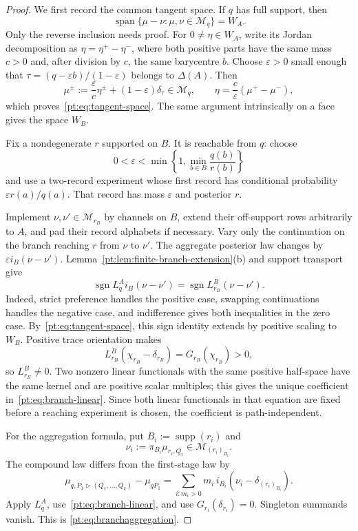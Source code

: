 \documentclass[11pt,a4paper]{article}
\theoremstyle{definition}
\newcommand{\1}{\mathbf 1}
\begin{document}
\begin{proof}
We first record the common tangent space.  If $q$ has full support, then
\begin{equation}
 \operatorname{span}\{\mu-\nu:\mu,\nu\in\mathcal M_q\}=W_A.
\label{pt:eq:tangent-space}
\end{equation}
Only the reverse inclusion needs proof.  For $0\ne\eta\in W_A$, write its
Jordan decomposition as $\eta=\eta^+-\eta^-$, where both positive parts have
the same mass $c>0$ and, after division by $c$, the same barycentre $b$.
Choose $\varepsilon>0$ small enough that
$\tau=(q-\varepsilon b)/(1-\varepsilon)$ belongs to $\Delta(A)$.  Then
\[
 \mu^\pm:=\frac{\varepsilon}{c}\eta^\pm
          +(1-\varepsilon)\delta_\tau
 \in\mathcal M_q,
 \qquad
 \eta=\frac c\varepsilon(\mu^+-\mu^-),
\]
which proves~\eqref{pt:eq:tangent-space}.  The same argument intrinsically on
a face gives the space $W_B$.

Fix a nondegenerate $r$ supported on $B$.  It is reachable from $q$: choose
\[
 0<\varepsilon<\min\left\{1,
       \min_{b\in B}\frac{q(b)}{r(b)}\right\}
\]
and use a two-record experiment whose first record has conditional probability
$\varepsilon r(a)/q(a)$.  That record has mass $\varepsilon$ and posterior
$r$.

Implement $\nu,\nu'\in\mathcal M_{r_B}$ by channels on $B$, extend their
off-support rows arbitrarily to $A$, and pad their record alphabets if
necessary.  Vary only the continuation on the branch reaching $r$ from
$\nu$ to $\nu'$.  The aggregate posterior law changes by
$\varepsilon i_B(\nu-\nu')$.  Lemma~\ref{pt:lem:finite-branch-extension}\textup{(b)} and
support transport give
\[
 \operatorname{sgn}L_q^Ai_B(\nu-\nu')
 =\operatorname{sgn}L_{r_B}^B(\nu-\nu').
\]
Indeed, strict preference handles the positive case, swapping continuations
handles the negative case, and indifference gives both inequalities in the
zero case.  By~\eqref{pt:eq:tangent-space}, this sign identity extends by
positive scaling to $W_B$.  Positive trace orientation makes
\[
 L_{r_B}^B(\chi_{r_B}-\delta_{r_B})
 =G_{r_B}(\chi_{r_B})>0,
\]
so $L_{r_B}^B\ne0$.  Two nonzero linear functionals with the same positive
half-space have the same kernel and are positive scalar multiples; this gives
the unique coefficient in~\eqref{pt:eq:branch-linear}.  Since both linear
functionals in that equation are fixed before a reaching experiment is
chosen, the coefficient is path-independent.

For the aggregation formula, put $B_i:=\operatorname{supp}(r_i)$ and
\[
 \nu_i:=\pi_{B_i}\mu_{r_i,Q_i}\in\mathcal M_{(r_i)_{B_i}}.
\]
The compound law differs from the first-stage law by
\[
 \mu_{q,P_1\triangleright(Q_1,\ldots,Q_k)}-\mu_{qP_1}
 =\sum_{i:m_i>0}m_i\,i_{B_i}
   (\nu_i-\delta_{(r_i)_{B_i}}).
\]
Apply $L_q^A$, use~\eqref{pt:eq:branch-linear}, and use
$G_{r_i}(\delta_{r_i})=0$.  Singleton summands vanish.  This is
\eqref{pt:eq:branchaggregation}.
\end{proof}
\end{document}
